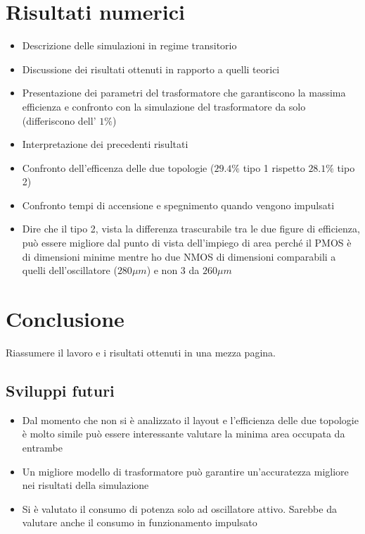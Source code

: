 \documentclass[a4paper]{article}
\begin{document}
\section{Risultati numerici}
\begin{itemize}
	\item Descrizione delle simulazioni in regime transitorio
	\item Discussione dei risultati ottenuti in rapporto a quelli teorici
	\item Presentazione dei parametri del trasformatore che garantiscono
		la massima efficienza e confronto con la simulazione del
		trasformatore da solo (differiscono dell' $ 1\% $)
	\item Interpretazione dei precedenti risultati
	\item Confronto dell'efficenza delle due topologie 
		($ 29.4\% $ tipo 1 rispetto $ 28.1\% $ tipo 2)
	\item Confronto tempi di accensione e spegnimento quando vengono impulsati
	\item Dire che il tipo 2, vista la differenza trascurabile tra le due
		figure di efficienza, può essere migliore dal punto di vista 
		dell'impiego di area perché il PMOS è di dimensioni minime mentre 
		ho due NMOS di dimensioni comparabili a quelli dell'oscillatore 
		($ 280\mu m $) e non 3 da $ 260\mu m $
\end{itemize}
\section{Conclusione}
Riassumere il lavoro e i risultati ottenuti in una mezza pagina.
\subsection{Sviluppi futuri}
\begin{itemize}
	\item Dal momento che non si è analizzato il layout e l'efficienza delle
		due topologie è molto simile può essere interessante valutare la 
		minima area occupata da entrambe
	\item Un migliore modello di trasformatore può garantire un'accuratezza
		migliore nei risultati della simulazione
	\item Si è valutato il consumo di potenza solo ad oscillatore attivo.
		Sarebbe da valutare anche il consumo in funzionamento impulsato
\end{itemize}
\end{document}
